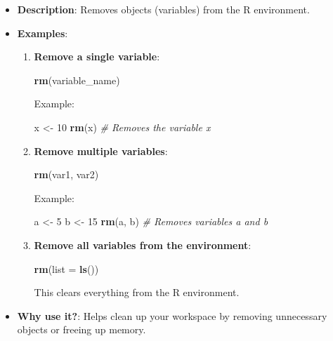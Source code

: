 \documentclass[
  11pt,
]{article}
\newenvironment{Shaded}{\begin{snugshade}}{\end{snugshade}}
\newcommand{\AttributeTok}[1]{\textcolor[rgb]{0.13,0.29,0.53}{#1}}
\newcommand{\CommentTok}[1]{\textcolor[rgb]{0.56,0.35,0.01}{\textit{#1}}}
\newcommand{\DecValTok}[1]{\textcolor[rgb]{0.00,0.00,0.81}{#1}}
\newcommand{\FunctionTok}[1]{\textcolor[rgb]{0.13,0.29,0.53}{\textbf{#1}}}
\newcommand{\NormalTok}[1]{#1}
\newcommand{\OtherTok}[1]{\textcolor[rgb]{0.56,0.35,0.01}{#1}}
\providecommand{\tightlist}{%
  \setlength{\itemsep}{0pt}\setlength{\parskip}{0pt}}
\begin{document}
\begin{itemize}
\tightlist
\item
  \textbf{Description}: Removes objects (variables) from the R
  environment.
\item
  \textbf{Examples}:

  \begin{enumerate}
  \def\labelenumi{\arabic{enumi}.}
  \item
    \textbf{Remove a single variable}:

\begin{Shaded}
\begin{Highlighting}[]
\FunctionTok{rm}\NormalTok{(variable\_name)}
\end{Highlighting}
\end{Shaded}

    Example:

\begin{Shaded}
\begin{Highlighting}[]
\NormalTok{x }\OtherTok{\textless{}{-}} \DecValTok{10}
\FunctionTok{rm}\NormalTok{(x)  }\CommentTok{\# Removes the variable x}
\end{Highlighting}
\end{Shaded}
  \item
    \textbf{Remove multiple variables}:

\begin{Shaded}
\begin{Highlighting}[]
\FunctionTok{rm}\NormalTok{(var1, var2)}
\end{Highlighting}
\end{Shaded}

    Example:

\begin{Shaded}
\begin{Highlighting}[]
\NormalTok{a }\OtherTok{\textless{}{-}} \DecValTok{5}
\NormalTok{b }\OtherTok{\textless{}{-}} \DecValTok{15}
\FunctionTok{rm}\NormalTok{(a, b)  }\CommentTok{\# Removes variables a and b}
\end{Highlighting}
\end{Shaded}
  \item
    \textbf{Remove all variables from the environment}:

\begin{Shaded}
\begin{Highlighting}[]
\FunctionTok{rm}\NormalTok{(}\AttributeTok{list =} \FunctionTok{ls}\NormalTok{())}
\end{Highlighting}
\end{Shaded}

    This clears everything from the R environment.
  \end{enumerate}
\item
  \textbf{Why use it?}: Helps clean up your workspace by removing
  unnecessary objects or freeing up memory.
\end{itemize}
\end{document}
